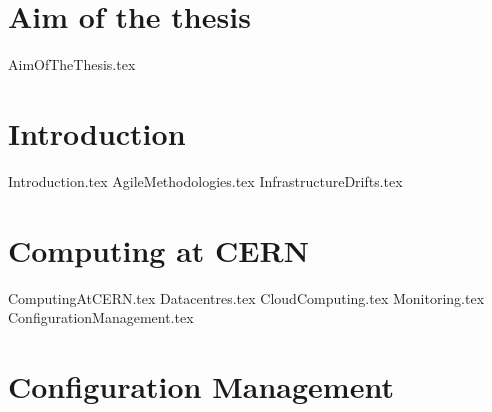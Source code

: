 \documentclass[12pt,a4paper,openright]{report}
\begin{document}

\chapter*{Aim of the thesis}

{AimOfTheThesis.tex}

\tableofcontents
\clearpage{\pagestyle{empty}\cleardoublepage}



\chapter{Introduction}


\fancyfoot{}
\fancyhead[RO,LE]{\thepage}
\fancyhead[LO]{\leftmark}
\fancyhead[RE]{\rightmark}


{Introduction.tex}
{AgileMethodologies.tex}
{InfrastructureDrifts.tex}

\chapter{Computing at CERN}

{ComputingAtCERN.tex}
{Datacentres.tex}
{CloudComputing.tex}
{Monitoring.tex}
{ConfigurationManagement.tex}

\chapter{Configuration Management}
\end{document}
